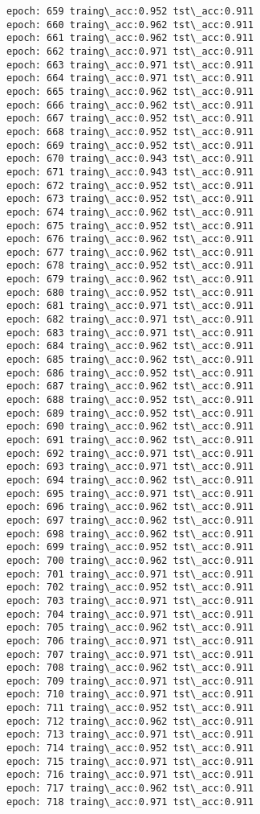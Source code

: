 \documentclass[11pt]{article}
\begin{document}
\begin{Verbatim}[commandchars=\\\{\}]
epoch: 659 traing\_acc:0.952 tst\_acc:0.911
epoch: 660 traing\_acc:0.962 tst\_acc:0.911
epoch: 661 traing\_acc:0.962 tst\_acc:0.911
epoch: 662 traing\_acc:0.971 tst\_acc:0.911
epoch: 663 traing\_acc:0.971 tst\_acc:0.911
epoch: 664 traing\_acc:0.971 tst\_acc:0.911
epoch: 665 traing\_acc:0.962 tst\_acc:0.911
epoch: 666 traing\_acc:0.962 tst\_acc:0.911
epoch: 667 traing\_acc:0.952 tst\_acc:0.911
epoch: 668 traing\_acc:0.952 tst\_acc:0.911
epoch: 669 traing\_acc:0.952 tst\_acc:0.911
epoch: 670 traing\_acc:0.943 tst\_acc:0.911
epoch: 671 traing\_acc:0.943 tst\_acc:0.911
epoch: 672 traing\_acc:0.952 tst\_acc:0.911
epoch: 673 traing\_acc:0.952 tst\_acc:0.911
epoch: 674 traing\_acc:0.962 tst\_acc:0.911
epoch: 675 traing\_acc:0.952 tst\_acc:0.911
epoch: 676 traing\_acc:0.962 tst\_acc:0.911
epoch: 677 traing\_acc:0.962 tst\_acc:0.911
epoch: 678 traing\_acc:0.952 tst\_acc:0.911
epoch: 679 traing\_acc:0.962 tst\_acc:0.911
epoch: 680 traing\_acc:0.952 tst\_acc:0.911
epoch: 681 traing\_acc:0.971 tst\_acc:0.911
epoch: 682 traing\_acc:0.971 tst\_acc:0.911
epoch: 683 traing\_acc:0.971 tst\_acc:0.911
epoch: 684 traing\_acc:0.962 tst\_acc:0.911
epoch: 685 traing\_acc:0.962 tst\_acc:0.911
epoch: 686 traing\_acc:0.952 tst\_acc:0.911
epoch: 687 traing\_acc:0.962 tst\_acc:0.911
epoch: 688 traing\_acc:0.952 tst\_acc:0.911
epoch: 689 traing\_acc:0.952 tst\_acc:0.911
epoch: 690 traing\_acc:0.962 tst\_acc:0.911
epoch: 691 traing\_acc:0.962 tst\_acc:0.911
epoch: 692 traing\_acc:0.971 tst\_acc:0.911
epoch: 693 traing\_acc:0.971 tst\_acc:0.911
epoch: 694 traing\_acc:0.962 tst\_acc:0.911
epoch: 695 traing\_acc:0.971 tst\_acc:0.911
epoch: 696 traing\_acc:0.962 tst\_acc:0.911
epoch: 697 traing\_acc:0.962 tst\_acc:0.911
epoch: 698 traing\_acc:0.962 tst\_acc:0.911
epoch: 699 traing\_acc:0.952 tst\_acc:0.911
epoch: 700 traing\_acc:0.962 tst\_acc:0.911
epoch: 701 traing\_acc:0.971 tst\_acc:0.911
epoch: 702 traing\_acc:0.952 tst\_acc:0.911
epoch: 703 traing\_acc:0.971 tst\_acc:0.911
epoch: 704 traing\_acc:0.971 tst\_acc:0.911
epoch: 705 traing\_acc:0.962 tst\_acc:0.911
epoch: 706 traing\_acc:0.971 tst\_acc:0.911
epoch: 707 traing\_acc:0.971 tst\_acc:0.911
epoch: 708 traing\_acc:0.962 tst\_acc:0.911
epoch: 709 traing\_acc:0.971 tst\_acc:0.911
epoch: 710 traing\_acc:0.971 tst\_acc:0.911
epoch: 711 traing\_acc:0.952 tst\_acc:0.911
epoch: 712 traing\_acc:0.962 tst\_acc:0.911
epoch: 713 traing\_acc:0.971 tst\_acc:0.911
epoch: 714 traing\_acc:0.952 tst\_acc:0.911
epoch: 715 traing\_acc:0.971 tst\_acc:0.911
epoch: 716 traing\_acc:0.971 tst\_acc:0.911
epoch: 717 traing\_acc:0.962 tst\_acc:0.911
epoch: 718 traing\_acc:0.971 tst\_acc:0.911

\end{Verbatim}
\end{document}
